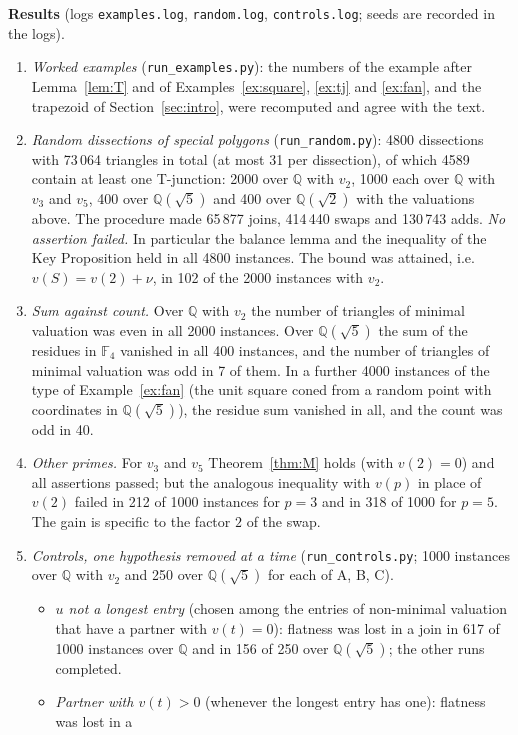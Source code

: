 \documentclass[11pt]{article}
\theoremstyle{definition}
\newcommand{\Q}{\mathbb{Q}}
\newcommand{\F}{\mathbb{F}}
\newcommand{\tL}[1]{\texttt{#1}}
\begin{document}
\textbf{Results} (logs \tL{examples.log}, \tL{random.log}, \tL{controls.log}; seeds are recorded in
the logs).
\begin{enumerate}
\item \emph{Worked examples} (\tL{run\_examples.py}): the numbers of the example after
Lemma~\ref{lem:T} and of Examples~\ref{ex:square}, \ref{ex:tj} and \ref{ex:fan}, and the trapezoid
of Section~\ref{sec:intro}, were recomputed and agree with the text.
\item \emph{Random dissections of special polygons} (\tL{run\_random.py}): 4800 dissections with
73\,064 triangles in total (at most 31 per dissection), of which 4589 contain at least one
T-junction: 2000 over $\Q$ with $v_2$, 1000 each over $\Q$ with $v_3$ and $v_5$, 400 over
$\Q(\sqrt5)$ and 400 over $\Q(\sqrt2)$ with the valuations above. The procedure made 65\,877 joins,
414\,440 swaps and 130\,743 adds. \emph{No assertion failed.} In particular the balance lemma and
the inequality of the Key Proposition held in all 4800 instances. The bound was attained, i.e.\
$v(S)=v(2)+\nu$, in 102 of the 2000 instances with $v_2$.
\item \emph{Sum against count.} Over $\Q$ with $v_2$ the number of triangles of minimal valuation was
even in all 2000 instances. Over $\Q(\sqrt5)$ the sum of the residues in $\F_4$ vanished in all 400
instances, and the number of triangles of minimal valuation was odd in 7 of them. In a further
4000 instances of the type of Example~\ref{ex:fan} (the unit square coned from a random point with
coordinates in $\Q(\sqrt5)$), the residue sum vanished in all, and the count was odd in 40.
\item \emph{Other primes.} For $v_3$ and $v_5$ Theorem~\ref{thm:M} holds (with $v(2)=0$) and all
assertions passed; but the analogous inequality with $v(p)$ in place of $v(2)$ failed in 212 of
1000 instances for $p=3$ and in 318 of 1000 for $p=5$. The gain is specific to the factor $2$ of
the swap.
\item \emph{Controls, one hypothesis removed at a time} (\tL{run\_controls.py}; 1000 instances over
$\Q$ with $v_2$ and 250 over $\Q(\sqrt5)$ for each of A, B, C).
\begin{itemize}
\item[A.] \emph{$u$ not a longest entry} (chosen among the entries of non-minimal valuation that
have a partner with $v(t)=0$): flatness was lost in a join in 617 of 1000 instances over $\Q$ and
in 156 of 250 over $\Q(\sqrt5)$; the other runs completed.
\item[B.] \emph{Partner with $v(t)>0$} (whenever the longest entry has one): flatness was lost in a

\end{itemize}
\end{enumerate}
\end{document}
